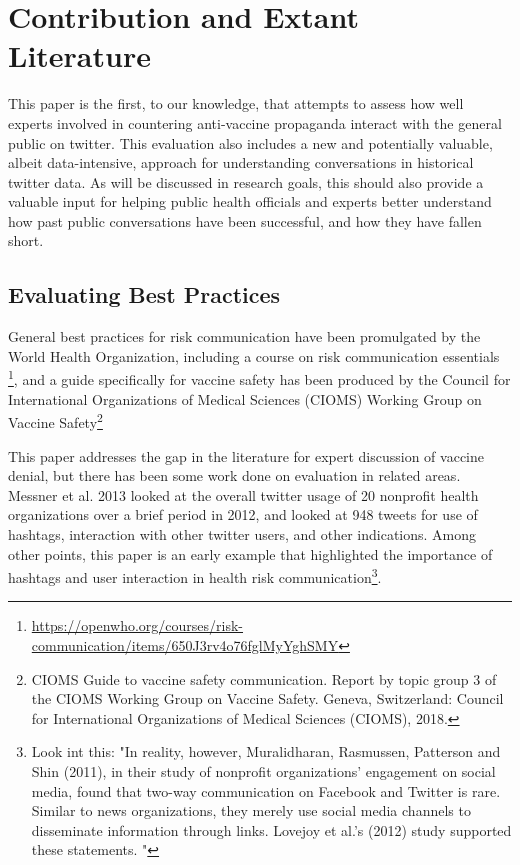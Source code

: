 \documentclass{article}
\begin{document}
\section{Contribution and Extant Literature}

This paper is the first, to our knowledge, that attempts to assess how well experts involved in countering anti-vaccine propaganda interact with the general public on twitter. This evaluation also includes a new and potentially valuable, albeit data-intensive, approach for understanding conversations in historical twitter data. As will be discussed in research goals, this should also provide a valuable input for helping public health officials and experts better understand how past public conversations have been successful, and how they have fallen short.

\subsection{Evaluating Best Practices}

General best practices for risk communication have been promulgated by the World Health Organization, including a course on risk communication essentials \footnote{\url{https://openwho.org/courses/risk-communication/items/650J3rv4o76fglMyYghSMY}}, and a guide specifically for vaccine safety has been produced by the Council for International Organizations of Medical Sciences (CIOMS) Working Group on Vaccine Safety\footnote{CIOMS Guide to vaccine safety communication. Report by topic group 3 of the CIOMS Working Group on Vaccine Safety. Geneva, Switzerland: Council for International Organizations of Medical Sciences (CIOMS), 2018.} 

This paper addresses the gap in the literature for expert discussion of vaccine denial, but there has been some work done on evaluation in related areas. Messner et al. 2013 looked at the overall twitter usage of 20 nonprofit health organizations over a brief period in 2012, and looked at 948 tweets for use of hashtags, interaction with other twitter users, and other indications. Among other points, this paper is an early example that highlighted the importance of hashtags and user interaction in health risk communication\footnote{Look int this: "In reality, however, Muralidharan, Rasmussen, Patterson and Shin
(2011), in their study of nonprofit organizations’ engagement on social
media, found that two-way communication on Facebook and Twitter
is rare. Similar to news organizations, they merely use social media
channels to disseminate information through links. Lovejoy et al.’s
(2012) study supported these statements. "}. 
\end{document}
